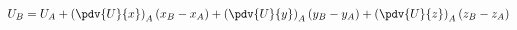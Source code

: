 \begin{equation}
U_B = U_A + \left(\pdv{U}{x}\right)_A (x_B - x_A)  + \left(\pdv{U}{y}\right)_A (y_B - y_A)  + \left(\pdv{U}{z}\right)_A (z_B - z_A)
\end{equation}

